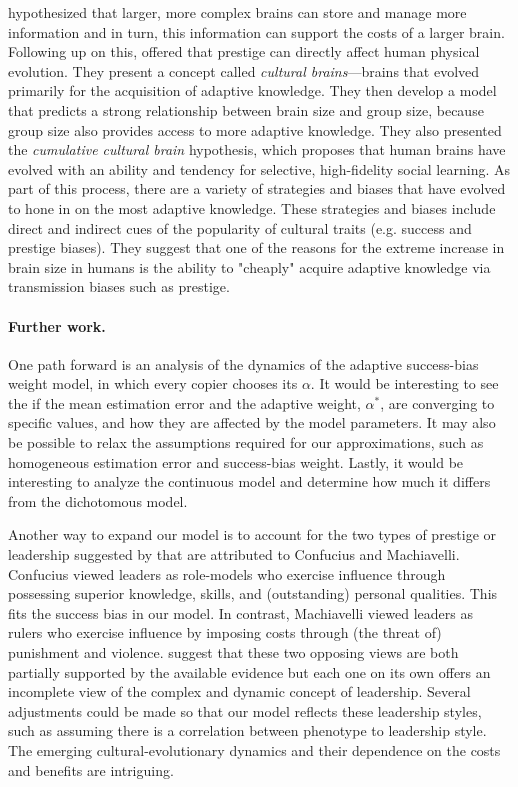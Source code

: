 \documentclass[12pt]{extarticle}
\begin{document}
\citet{social_brains} hypothesized that larger, more complex brains can store and manage more information and in turn, this information can support the costs of a larger brain.
Following up on this, \citet{collective_brains} offered that prestige can directly affect human physical evolution. They present a concept called \emph{cultural brains}---brains that evolved primarily for the acquisition of adaptive knowledge.
They then develop a model that predicts a strong relationship between brain size and group size, because group size also provides access to more adaptive knowledge. 
They also presented the \emph{cumulative cultural brain} hypothesis, which proposes that human brains have evolved with an ability and tendency for selective, high-fidelity social learning. As part of this process, there are a variety of strategies and biases that have evolved to hone in on the most adaptive knowledge. These strategies and biases include direct and indirect cues of the popularity of cultural traits (e.g. success and prestige biases).
They suggest that one of the reasons for the extreme increase in brain size in humans is the ability to "cheaply" acquire adaptive knowledge via transmission biases such as prestige.

\paragraph{Further work.}
One path forward is an analysis of the dynamics of the adaptive success-bias weight model, in which every copier chooses its $\alpha$. It would be interesting to see the if the mean estimation error and the adaptive weight, $\alpha^*$, are converging to specific values, and how they are affected by the model parameters.
It may also be possible to relax the assumptions required for our approximations, such as homogeneous estimation error and success-bias weight.
Lastly, it would be interesting to analyze the continuous model and determine how much it differs from the dichotomous model. 

Another way to expand our model is to account for the two types of prestige or leadership suggested by \citet{dual_leadership} that are attributed to Confucius and Machiavelli. Confucius viewed leaders as role-models who exercise influence through possessing superior knowledge, skills, and (outstanding) personal qualities. This fits the success bias in our model. 
In contrast, Machiavelli viewed leaders as rulers who exercise influence by imposing costs through (the threat of) punishment and violence. 
\citet{dual_leadership} suggest that these two opposing views are both partially supported by the available evidence but each one on its own offers an incomplete view of the complex and dynamic concept of leadership. 
Several adjustments could be made so that our model reflects these leadership styles, such as assuming there is a correlation between phenotype to leadership style. 
The emerging cultural-evolutionary dynamics and their dependence on the costs and benefits are intriguing.
\end{document}

